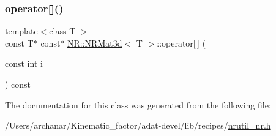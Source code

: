\subsubsection{\texorpdfstring{operator[]()}{operator[]()}\hspace{0.1cm}{\footnotesize\ttfamily [6/6]}}
{\footnotesize\ttfamily template$<$class T $>$ \\
const T$\ast$ const$\ast$ \mbox{\hyperlink{classNR_1_1NRMat3d}{N\+R\+::\+N\+R\+Mat3d}}$<$ T $>$\+::operator\mbox{[}$\,$\mbox{]} (\begin{DoxyParamCaption}\item[{const int}]{i }\end{DoxyParamCaption}) const\hspace{0.3cm}{\ttfamily [inline]}}



The documentation for this class was generated from the following file\+:\begin{DoxyCompactItemize}
\item 
/\+Users/archanar/\+Kinematic\+\_\+factor/adat-\/devel/lib/recipes/\mbox{\hyperlink{adat-devel_2lib_2recipes_2nrutil__nr_8h}{nrutil\+\_\+nr.\+h}}\end{DoxyCompactItemize}
